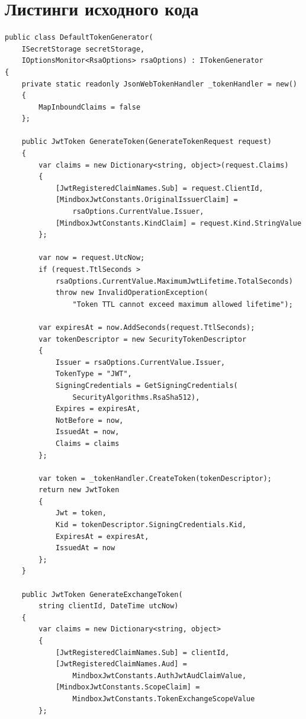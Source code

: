 \chapter{Листинги исходного кода}\label{app:source-code}

\begin{lstlisting}[language={[Sharp]C},
  label={lst:app-token-generator},
  caption={Класс DefaultTokenGenerator: генерация и подпись JWT-токенов}]
public class DefaultTokenGenerator(
    ISecretStorage secretStorage,
    IOptionsMonitor<RsaOptions> rsaOptions) : ITokenGenerator
{
    private static readonly JsonWebTokenHandler _tokenHandler = new()
    {
        MapInboundClaims = false
    };

    public JwtToken GenerateToken(GenerateTokenRequest request)
    {
        var claims = new Dictionary<string, object>(request.Claims)
        {
            [JwtRegisteredClaimNames.Sub] = request.ClientId,
            [MindboxJwtConstants.OriginalIssuerClaim] =
                rsaOptions.CurrentValue.Issuer,
            [MindboxJwtConstants.KindClaim] = request.Kind.StringValue
        };

        var now = request.UtcNow;
        if (request.TtlSeconds >
            rsaOptions.CurrentValue.MaximumJwtLifetime.TotalSeconds)
            throw new InvalidOperationException(
                "Token TTL cannot exceed maximum allowed lifetime");

        var expiresAt = now.AddSeconds(request.TtlSeconds);
        var tokenDescriptor = new SecurityTokenDescriptor
        {
            Issuer = rsaOptions.CurrentValue.Issuer,
            TokenType = "JWT",
            SigningCredentials = GetSigningCredentials(
                SecurityAlgorithms.RsaSha512),
            Expires = expiresAt,
            NotBefore = now,
            IssuedAt = now,
            Claims = claims
        };

        var token = _tokenHandler.CreateToken(tokenDescriptor);
        return new JwtToken
        {
            Jwt = token,
            Kid = tokenDescriptor.SigningCredentials.Kid,
            ExpiresAt = expiresAt,
            IssuedAt = now
        };
    }

    public JwtToken GenerateExchangeToken(
        string clientId, DateTime utcNow)
    {
        var claims = new Dictionary<string, object>
        {
            [JwtRegisteredClaimNames.Sub] = clientId,
            [JwtRegisteredClaimNames.Aud] =
                MindboxJwtConstants.AuthJwtAudClaimValue,
            [MindboxJwtConstants.ScopeClaim] =
                MindboxJwtConstants.TokenExchangeScopeValue
        };


\end{lstlisting}
